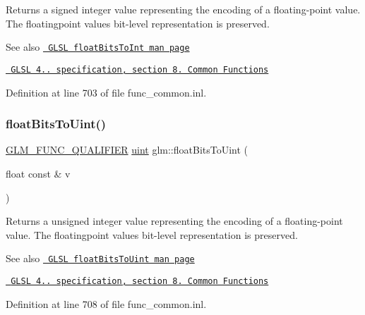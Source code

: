Returns a signed integer value representing the encoding of a floating-\/point value. The floatingpoint value\textquotesingle{}s bit-\/level representation is preserved.

\begin{DoxySeeAlso}{See also}
\href{http://www.opengl.org/sdk/docs/manglsl/xhtml/floatBitsToInt.xml}{\texttt{ G\+L\+SL float\+Bits\+To\+Int man page}} 

\href{http://www.opengl.org/registry/doc/GLSLangSpec.4.20.8.pdf}{\texttt{ G\+L\+SL 4.. specification, section 8. Common Functions}} 
\end{DoxySeeAlso}


Definition at line 703 of file func\+\_\+common.\+inl.

\mbox{\label{group__core__func__common_ga748b4d2819b48d28ca09dc8733488873}} 
\subsubsection{\texorpdfstring{floatBitsToUint()}{floatBitsToUint()}\hspace{0.1cm}{\footnotesize\ttfamily [1/2]}}
{\footnotesize\ttfamily \mbox{\hyperlink{setup_8hpp_a33fdea6f91c5f834105f7415e2a64407}{G\+L\+M\+\_\+\+F\+U\+N\+C\+\_\+\+Q\+U\+A\+L\+I\+F\+I\+ER}} \mbox{\hyperlink{group__core__precision_ga4fd29415871152bfb5abd588334147c8}{uint}} glm\+::float\+Bits\+To\+Uint (\begin{DoxyParamCaption}\item[{float const \&}]{v }\end{DoxyParamCaption})}

Returns a unsigned integer value representing the encoding of a floating-\/point value. The floatingpoint value\textquotesingle{}s bit-\/level representation is preserved.

\begin{DoxySeeAlso}{See also}
\href{http://www.opengl.org/sdk/docs/manglsl/xhtml/floatBitsToUint.xml}{\texttt{ G\+L\+SL float\+Bits\+To\+Uint man page}} 

\href{http://www.opengl.org/registry/doc/GLSLangSpec.4.20.8.pdf}{\texttt{ G\+L\+SL 4.. specification, section 8. Common Functions}} 
\end{DoxySeeAlso}


Definition at line 708 of file func\+\_\+common.\+inl.

